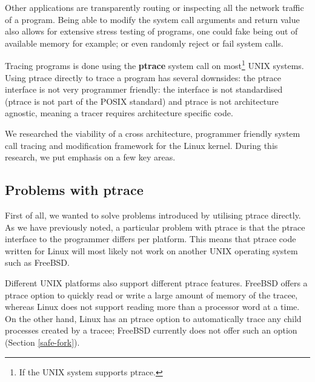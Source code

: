 \documentclass[a4paper, 10pt]{report}
\begin{document}
Other applications are transparently routing or inspecting all the
network traffic of a program.
Being able to modify the system call arguments and return value also allows
for extensive stress testing of programs, one could fake being out of available
memory for example; or even randomly reject or fail system calls.

Tracing programs is done using the \textbf{ptrace} system call on
most\footnote{If the UNIX system supports ptrace.} UNIX systems. %
Using ptrace directly to trace a program has several downsides: the ptrace
interface is not very programmer friendly: the interface is not standardised
(ptrace is not part of the POSIX\cite{posix} standard) and ptrace is not
architecture agnostic, meaning a tracer requires architecture specific code.

%

We researched the viability of a cross architecture, programmer friendly
system call tracing and modification framework for the Linux kernel.
During this research, we put emphasis on a few key areas.

\subsection{Problems with ptrace} %
First of all, we wanted to solve problems introduced by utilising ptrace
directly. As we have previously noted, a particular problem with ptrace is that
the ptrace interface to the programmer differs per platform. This means that
ptrace code written for Linux will most likely not work on another UNIX operating
system such as FreeBSD.

Different UNIX platforms also support different ptrace features. FreeBSD offers
a ptrace option to quickly read or write a large amount of memory of the
tracee, whereas Linux does not support reading more than a processor word at a
time. On the other hand, Linux has an ptrace option to automatically trace
any child processes created by a tracee; FreeBSD currently does not offer such
an option (Section \ref{safe-fork}). %
\end{document}
